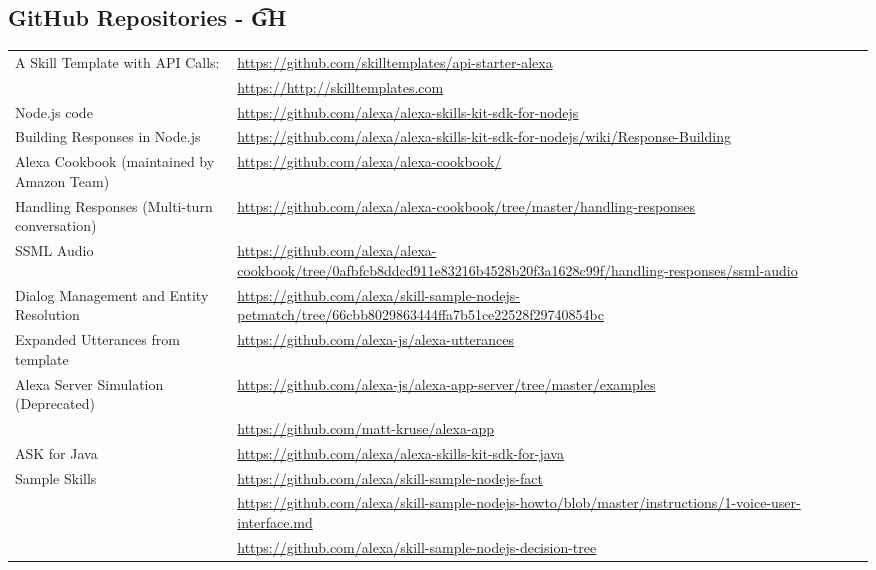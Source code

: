\subsection*{GitHub Repositories - \t{GH}}


\begin{flushleft}
	\begin{tabu} to \textwidth {X | X[2]}
		
		
A Skill Template with API Calls: & 
\url{https://github.com/skilltemplates/api-starter-alexa} \\ 
& \url{https://http://skilltemplates.com}\\  \hline
Node.js code &
\url{https://github.com/alexa/alexa-skills-kit-sdk-for-nodejs}\\

Building Responses in Node.js & 
\url{https://github.com/alexa/alexa-skills-kit-sdk-for-nodejs/wiki/Response-Building}\\ \hline


Alexa Cookbook (maintained by Amazon Team) & 
\url{https://github.com/alexa/alexa-cookbook/}\\ \hline

Handling Responses (Multi-turn conversation) & 
\url{https://github.com/alexa/alexa-cookbook/tree/master/handling-responses}\\ \hline
		
SSML Audio & 
\url{https://github.com/alexa/alexa-cookbook/tree/0afbfcb8ddcd911e83216b4528b20f3a1628c99f/handling-responses/ssml-audio}\\ \hline
		
Dialog Management and Entity Resolution &		
		\url{https://github.com/alexa/skill-sample-nodejs-petmatch/tree/66cbb8029863444ffa7b51ce22528f29740854bc}\\ \hline

Expanded Utterances from template &
\url{https://github.com/alexa-js/alexa-utterances}\\ \hline

Alexa Server Simulation (Deprecated) & 
\url{https://github.com/alexa-js/alexa-app-server/tree/master/examples} \\ 
& \url{https://github.com/matt-kruse/alexa-app}\\ \hline

ASK for Java & \url{https://github.com/alexa/alexa-skills-kit-sdk-for-java}\\ \hline

Sample Skills & \url{https://github.com/alexa/skill-sample-nodejs-fact} \\ & \url{https://github.com/alexa/skill-sample-nodejs-howto/blob/master/instructions/1-voice-user-interface.md} \\ & \url{https://github.com/alexa/skill-sample-nodejs-decision-tree}\\ \hline


\end{tabu}
\end{flushleft}
